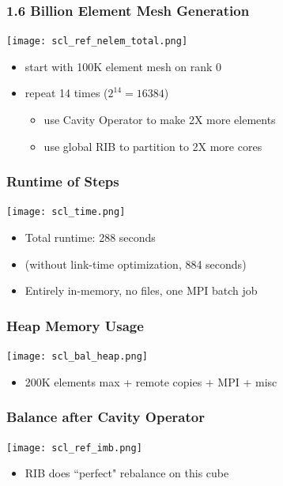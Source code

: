 \documentclass{beamer}
\begin{document}
\begin{frame}
\frametitle{1.6 Billion Element Mesh Generation}
\begin{center}
\texttt{[image: scl\_ref\_nelem\_total.png]}
\end{center}
\begin{itemize}
\item start with 100K element mesh on rank 0
\item repeat 14 times ($2^{14} = 16384$)
\begin{itemize}
\item use Cavity Operator to make 2X more elements
\item use global RIB to partition to 2X more cores
\end{itemize}
\end{itemize}
\end{frame}

\begin{frame}
\frametitle{Runtime of Steps}
\begin{center}
\texttt{[image: scl\_time.png]}
\end{center}
\begin{itemize}
\item Total runtime: 288 seconds
\item (without link-time optimization, 884 seconds)
\item Entirely in-memory, no files, one MPI batch job
\end{itemize}
\end{frame}

\begin{frame}
\frametitle{Heap Memory Usage}
\begin{center}
\texttt{[image: scl\_bal\_heap.png]}
\end{center}
\begin{itemize}
\item 200K elements max + remote copies + MPI + misc
\end{itemize}
\end{frame}

\begin{frame}
\frametitle{Balance after Cavity Operator}
\begin{center}
\texttt{[image: scl\_ref\_imb.png]}
\end{center}
\begin{itemize}
\item RIB does ``perfect" rebalance on this cube
\end{itemize}
\end{frame}
\end{document}
